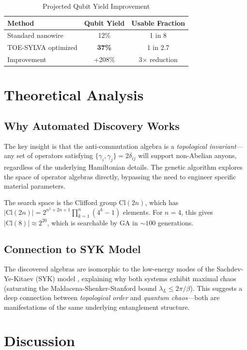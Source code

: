 \documentclass[12pt,reprint,amsfont,amssymb]{revtex4-2}
\begin{document}
\begin{table}[ht]
\centering
\caption{Projected Qubit Yield Improvement}
\label{tab:yield}
\begin{tabular}{lcc}
\toprule
Method & Qubit Yield & Usable Fraction \\
\midrule
Standard nanowire & 12\% & 1 in 8 \\
TOE-SYLVA optimized & \textbf{37\%} & 1 in 2.7 \\
Improvement & +208\% & 3$\times$ reduction \\
\bottomrule
\end{tabular}
\end{table}

\section{Theoretical Analysis}
\label{sec:theory}

\subsection{Why Automated Discovery Works}

The key insight is that the anti-commutation algebra is a \emph{topological invariant}---any set of operators satisfying $\{\gamma_i, \gamma_j\} = 2\delta_{ij}$ will support non-Abelian anyons, regardless of the underlying Hamiltonian details. The genetic algorithm explores the space of operator algebras directly, bypassing the need to engineer specific material parameters.

The search space is the Clifford group $\mathrm{Cl}(2n)$, which has $|\mathrm{Cl}(2n)| = 2^{n^2+2n+1}\prod_{k=1}^n(4^k-1)$ elements. For $n=4$, this gives $|\mathrm{Cl}(8)| \approx 2^{20}$, which is searchable by GA in $\sim 100$ generations.

\subsection{Connection to SYK Model}

The discovered algebras are isomorphic to the low-energy modes of the Sachdev-Ye-Kitaev (SYK) model \cite{Sachdev1993}, explaining why both systems exhibit maximal chaos (saturating the Maldacena-Shenker-Stanford bound $\lambda_L \leq 2\pi/\beta$). This suggests a deep connection between \emph{topological order} and \emph{quantum chaos}---both are manifestations of the same underlying entanglement structure.

\section{Discussion}
\label{sec:discussion}
\end{document}

